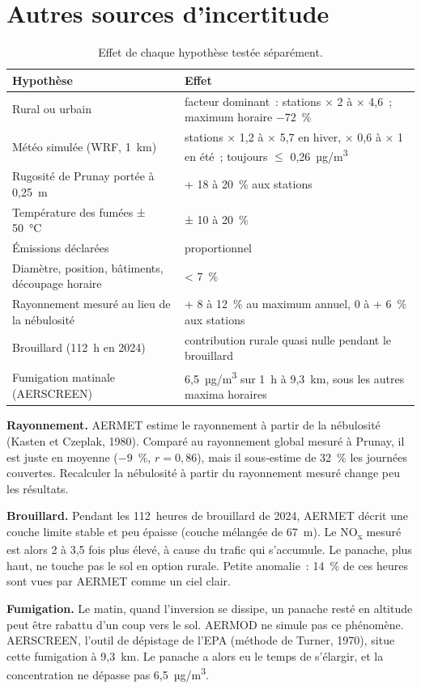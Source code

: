 \documentclass[11pt,a4paper]{article}
\newcommand{\NOx}{NO\textsubscript{x}}
\newcommand{\ugm}{µg/m\textsuperscript{3}}
\begin{document}
\section{Autres sources d'incertitude}
\begin{table}[htbp]
\centering\small
\caption{Effet de chaque hypothèse testée séparément.}
\begin{tabularx}{\textwidth}{lY}
\toprule
Hypothèse & Effet \\
\midrule
Rural ou urbain & facteur dominant~: stations × 2 à × 4,6~; maximum horaire $-72$~\% \\
Météo simulée (WRF, 1~km) & stations × 1,2 à × 5,7 en hiver, × 0,6 à × 1 en été~; toujours $\leq$ 0,26~\ugm{} \\
Rugosité de Prunay portée à 0,25~m & + 18 à 20~\% aux stations \\
Température des fumées ± 50~°C & ± 10 à 20~\% \\
Émissions déclarées & proportionnel \\
Diamètre, position, bâtiments, découpage horaire & < 7~\% \\
Rayonnement mesuré au lieu de la nébulosité & + 8 à 12~\% au maximum annuel, 0 à + 6~\% aux stations \\
Brouillard (112~h en 2024) & contribution rurale quasi nulle pendant le brouillard \\
Fumigation matinale (AERSCREEN) & 6,5~\ugm{} sur 1~h à 9,3~km, sous les autres maxima horaires \\
\bottomrule
\end{tabularx}
\end{table}

\textbf{Rayonnement.} AERMET estime le rayonnement à partir de la nébulosité (Kasten et Czeplak, 1980). Comparé au
rayonnement global mesuré à Prunay, il est juste en moyenne ($-9$~\%, $r = 0{,}86$), mais il sous-estime de 32~\% les
journées couvertes. Recalculer la nébulosité à partir du rayonnement mesuré change peu les résultats.

\textbf{Brouillard.} Pendant les 112~heures de brouillard de 2024, AERMET décrit une couche limite stable et peu
épaisse (couche mélangée de 67~m). Le \NOx{} mesuré est alors 2 à 3,5 fois plus élevé, à cause du trafic qui
s'accumule. Le panache, plus haut, ne touche pas le sol en option rurale. Petite anomalie~: 14~\% de ces heures
sont vues par AERMET comme un ciel clair.

\textbf{Fumigation.} Le matin, quand l'inversion se dissipe, un panache resté en altitude peut être rabattu d'un
coup vers le sol. AERMOD ne simule pas ce phénomène. AERSCREEN, l'outil de dépistage de l'EPA (méthode de Turner,
1970), situe cette fumigation à 9,3~km. Le panache a alors eu le temps de s'élargir, et la concentration ne dépasse
pas 6,5~\ugm.
\end{document}
